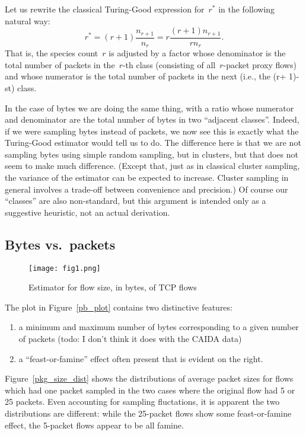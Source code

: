 \documentclass{paper}
\begin{document}
Let us rewrite the classical Turing-Good expression for~$r^*$ in the following
natural way:
$$ r^* =(r + 1) \frac{n_{r+1}}{n_r} = r \frac{(r+1)n_{r+1}}{rn_r}. $$
That is, the species count~$r$ is adjusted by a factor whose denominator is the
total number of packets in the~$r$-th class (consisting of all~$r$-packet proxy
flows) and whose numerator is the total number of packets in the next (i.e., the
(r+ 1)- st) class.

In the case of bytes we are doing the same thing, with a ratio whose numerator
and denominator are the total number of bytes in two ``adjacent classes''.
Indeed, if we were sampling bytes instead of packets, we now see this is exactly
what the Turing-Good estimator would tell us to do. The difference here is that
we are not sampling bytes using simple random sampling, but in clusters, but
that does not seem to make much difference. (Except that, just as in classical
cluster sampling, the variance of the estimator can be expected to increase.
Cluster sampling in general involves a trade-off between convenience and
precision.) Of course our ``classes'' are also non-standard, but this argument
is intended only as a suggestive heuristic, not an actual derivation.

\subsection{Bytes vs.\ packets}

\begin{figure}[h]
\begin{center}
\texttt{[image: fig1.png]}
\caption{Estimator for flow size, in bytes, of TCP flows}
\label{size_est}
\end{center}
\end{figure}

The plot in Figure~\ref{pb_plot} contains two distinctive features:
\begin{enumerate}
  \item a minimum and maximum number of bytes corresponding to a given number
    of packets (todo: I don't think it does with the CAIDA data)
  \item a ``feast-or-famine'' effect often present that is evident on the
    right.
\end{enumerate}
Figure~\ref{pkg_size_dist} shows the distributions of average packet sizes for flows which
had one packet sampled in the two cases where the original flow had 5 or 25
packets. Even accounting for sampling fluctations, it is apparent the two
distributions are different: while the 25-packet flows show some feast-or-famine
effect, the 5-packet flows appear to be all famine.
\end{document}
